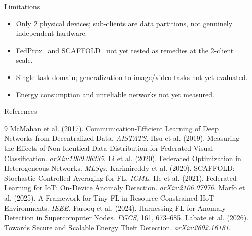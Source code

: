 \documentclass[final]{beamer}
\newlength{\sepwidth}
\newlength{\colwidth}
\newcommand{\separatorcolumn}{\begin{column}{\sepwidth}\end{column}}
\begin{document}
\begin{frame}[t]
\begin{columns}[t]
\begin{column}{\colwidth}
  \begin{block}{Limitations}
    \small
    \begin{itemize}\setlength\itemsep{0.05em}
      \item Only 2 physical devices; sub-clients are data partitions,
            not genuinely independent hardware.
      \item FedProx~\cite{fedprox} and SCAFFOLD~\cite{scaffold}
            not yet tested as remedies at the 2-client scale.
      \item Single task domain; generalization to image/video tasks
            not yet evaluated.
      \item Energy consumption and unreliable networks not yet measured.
    \end{itemize}
  \end{block}

  \begin{block}{References}
    \scriptsize
    \begin{thebibliography}{9}
     McMahan et al. (2017). Communication-Efficient Learning
    of Deep Networks from Decentralized Data. \textit{AISTATS}.
     Hsu et al. (2019). Measuring the Effects of Non-Identical
    Data Distribution for Federated Visual Classification. \textit{arXiv:1909.06335}.
     Li et al. (2020). Federated Optimization in
    Heterogeneous Networks. \textit{MLSys}.
     Karimireddy et al. (2020). SCAFFOLD: Stochastic
    Controlled Averaging for FL. \textit{ICML}.
     He et al. (2021). Federated Learning for IoT:
    On-Device Anomaly Detection. \textit{arXiv:2106.07976}.
     Marfo et al. (2025). A Framework for Tiny FL in
    Resource-Constrained IIoT Environments. \textit{IEEE}.
     Farooq et al. (2024). Harnessing FL for Anomaly
    Detection in Supercomputer Nodes. \textit{FGCS}, 161, 673--685.
     Labate et al. (2026). Towards Secure and Scalable
    Energy Theft Detection. \textit{arXiv:2602.16181}.
    \end{thebibliography}
  \end{block}

\end{column}
\separatorcolumn
\end{columns}
\end{frame}
\end{document}
